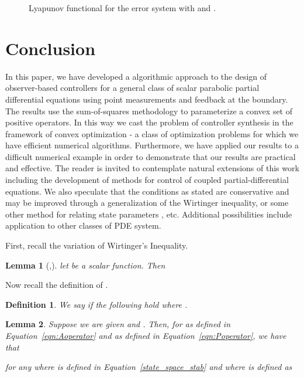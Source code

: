 \documentclass[9pt,journal,twocolumn]{IEEEtran}
\newtheorem{definition}{Definition}
\newtheorem{lemma}{Lemma}
\begin{document}
\begin{figure}[ht]
\centering
{}
\caption{Lyapunov functional for the error system with  and .}
\label{fig:V_observer}
\end{figure}

\section{Conclusion}

 In this paper, we have developed a algorithmic approach to the design of observer-based controllers for a general class of scalar parabolic partial differential equations using point measurements and feedback at the boundary. The results use the sum-of-squares methodology to parameterize a convex set of positive operators. In this way we cast the problem of controller synthesis in the framework of convex optimization - a class of optimization problems for which we have efficient numerical algorithms. Furthermore, we have applied our results to a difficult numerical example in order to demonstrate that our results are practical and effective. The reader is invited to contemplate natural extensions of this work including the development of methods for control of coupled partial-differential equations. We also speculate that the conditions as stated are conservative and may be improved through a generalization of the Wirtinger inequality, or some other method for relating state parameters , etc. Additional possibilities include application to other classes of PDE system.



\appendix\label{sec:appendix}
First, recall the variation  of Wirtinger's Inequality.
\begin{lemma}[\cite{hardy1952inequalities},\cite{krstic2008boundary}]
\label{lem:wirtinger}
 let  be a scalar function. Then
  
\end{lemma}
Now recall the definition of .
\begin{definition}
We say  if the following hold
 where .
\end{definition}

\begin{lemma}\label{lem:primal}
Suppose we are given   and . Then, for  as defined in Equation~\eqref{eqn:Aoperator} and  as defined in Equation~\eqref{eqn:Poperator}, we have that

for any  where  is defined in Equation~\eqref{state_space_stab} and where  is defined as

\end{lemma}
\end{document}
